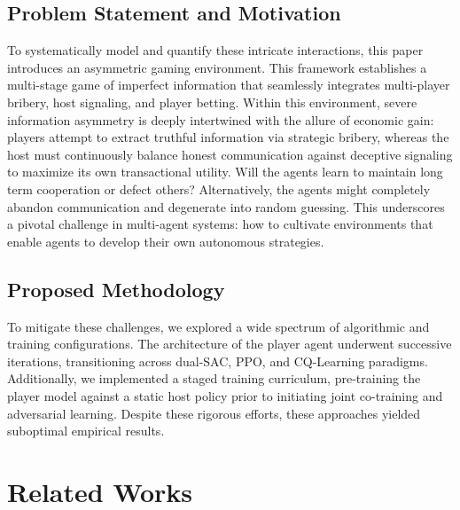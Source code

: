 \documentclass{article}
\begin{document}
\subsection{Problem Statement and Motivation}

To systematically model and quantify these intricate interactions, this paper introduces an asymmetric gaming environment.
This framework establishes a multi-stage game of imperfect information that seamlessly integrates multi-player bribery, host signaling, and player betting.
Within this environment, severe information asymmetry is deeply intertwined with the allure of economic gain: players attempt to extract truthful information via strategic bribery, whereas the host must continuously balance honest communication against deceptive signaling to maximize its own transactional utility.
Will the agents learn to maintain long term cooperation or defect others?
Alternatively, the agents might completely abandon communication and degenerate into random guessing. This underscores a pivotal challenge in multi-agent systems: how to cultivate environments that enable agents to develop their own autonomous strategies.

\subsection{Proposed Methodology}

To mitigate these challenges, we explored a wide spectrum of algorithmic and training configurations. The architecture of the player agent underwent successive iterations, transitioning across dual-SAC, PPO, and CQ-Learning paradigms. 
Additionally, we implemented a staged training curriculum, pre-training the player model against a static host policy prior to initiating joint co-training and adversarial learning. 
Despite these rigorous efforts, these approaches yielded suboptimal empirical results. 




\section{Related Works}
\subsection{}
\end{document}
